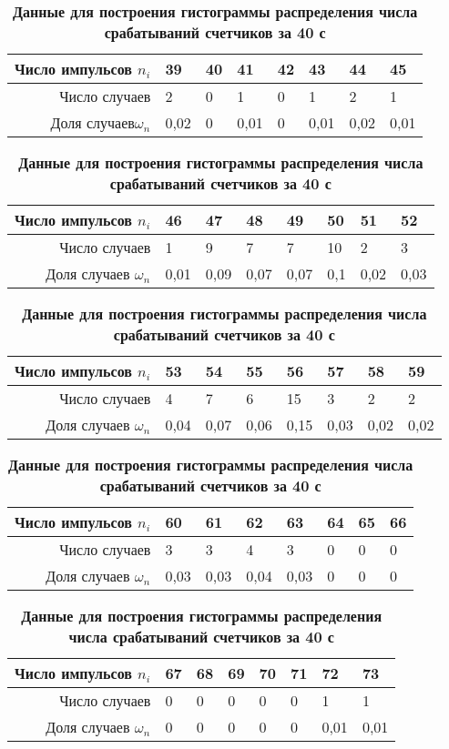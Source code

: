 \documentclass[a4paper, 12pt]{article}%
\begin{document}
\begin{table}
\caption{\textbf{Данные для построения гистограммы распределения числа срабатываний счетчиков за 40 с}}
\begin{tabular}{|r|p{1cm}|p{1cm}|p{1cm}|p{1cm}|p{1cm}|p{1cm}|p{1cm}|}
\hline
Число импульсов $n_i$&39&40&41&42&43&44&45\\ 
\hline
Число случаев&2&0&1&0&1&2&1\\ 
\hline
Доля случаев$\omega_n$&0,02&0&0,01&0&0,01&0,02&0,01\\ 
\hline
\end{tabular}
\begin{tabular}{|r|p{1cm}|p{1cm}|p{1cm}|p{1cm}|p{1cm}|p{1cm}|p{1cm}|}
\hline
Число импульсов $n_i$&46&47&48&49&50&51&52\\ 
\hline
Число случаев&1&9&7&7&10&2&3\\ 
\hline
Доля случаев $\omega_n$&0,01&0,09&0,07&0,07&0,1&0,02&0,03\\ 
\hline
\end{tabular}
\begin{tabular}{|r|p{1cm}|p{1cm}|p{1cm}|p{1cm}|p{1cm}|p{1cm}|p{1cm}|}
\hline
Число импульсов $n_i$&53&54&55&56&57&58&59\\ 
\hline
Число случаев&4&7&6&15&3&2&2\\ 
\hline
Доля случаев $\omega_n$&0,04&0,07&0,06&0,15&0,03&0,02&0,02\\
\hline 
\end{tabular}
\begin{tabular}{|r|p{1cm}|p{1cm}|p{1cm}|p{1cm}|p{1cm}|p{1cm}|p{1cm}|}
\hline
Число импульсов $n_i$&60&61&62&63&64&65&66\\ 
\hline
Число случаев&3&3&4&3&0&0&0\\ 
\hline
Доля случаев $\omega_n$&0,03&0,03&0,04&0,03&0&0&0\\
\hline
\end{tabular}
\begin{tabular}{|r|p{1cm}|p{1cm}|p{1cm}|p{1cm}|p{1cm}|p{1cm}|p{1cm}|}
\hline
Число импульсов $n_i$&67&68&69&70&71&72&73\\
\hline
Число случаев&0&0&0&0&0&1&1\\
\hline
Доля случаев $\omega_n$&0&0&0&0&0&0,01&0,01\\
\hline
\end{tabular}
\end{table}
\end{document}
